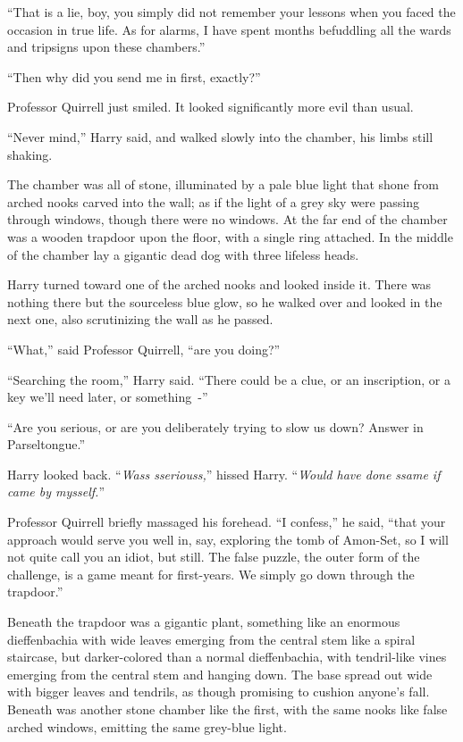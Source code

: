 ``That is a lie, boy, you simply did not remember your lessons when you faced the occasion in true life. As for alarms, I have spent months befuddling all the wards and tripsigns upon these chambers.''

``Then why did you send me in first, exactly?''

Professor Quirrell just smiled. It looked significantly more evil than usual.

``Never mind,'' Harry said, and walked slowly into the chamber, his limbs still shaking.

The chamber was all of stone, illuminated by a pale blue light that shone from arched nooks carved into the wall; as if the light of a grey sky were passing through windows, though there were no windows. At the far end of the chamber was a wooden trapdoor upon the floor, with a single ring attached. In the middle of the chamber lay a gigantic dead dog with three lifeless heads.

Harry turned toward one of the arched nooks and looked inside it. There was nothing there but the sourceless blue glow, so he walked over and looked in the next one, also scrutinizing the wall as he passed.

``What,'' said Professor Quirrell, ``are you doing?''

``Searching the room,'' Harry said. ``There could be a clue, or an inscription, or a key we'll need later, or something~-''

``Are you serious, or are you deliberately trying to slow us down? Answer in Parseltongue.''

Harry looked back. ``\emph{Wass sseriouss,}'' hissed Harry. ``\emph{Would have done ssame if came by mysself.}''

Professor Quirrell briefly massaged his forehead. ``I confess,'' he said, ``that your approach would serve you well in, say, exploring the tomb of Amon-Set, so I will not quite call you an idiot, but still. The false puzzle, the outer form of the challenge, is a game meant for first-years. We simply go down through the trapdoor.''

Beneath the trapdoor was a gigantic plant, something like an enormous dieffenbachia with wide leaves emerging from the central stem like a spiral staircase, but darker-colored than a normal dieffenbachia, with tendril-like vines emerging from the central stem and hanging down. The base spread out wide with bigger leaves and tendrils, as though promising to cushion anyone's fall. Beneath was another stone chamber like the first, with the same nooks like false arched windows, emitting the same grey-blue light.

